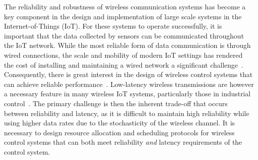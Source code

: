 The reliability and robustness of wireless communication systems has become a key component in the design and implementation of large scale systems in the Internet-of-Things (IoT). For these systems to operate successfully, it is important that the data collected by sensors can be communicated throughout the IoT network. While the most reliable form of data communication is through wired connections, the scale and mobility of modern IoT settings has rendered the cost of installing and maintaining a wired network a significant challenge~\cite{wollschlaeger2017future}. Consequently, there is great interest in the design of wireless control systems that can achieve reliable performance~\cite{varghese2014wireless, li2017review}. Low-latency wireless transmissions are however a necessary feature in many wireless IoT systems, particularly those in industrial control~\cite{varghese2014wireless}.  The primary challenge is then the inherent trade-off that occurs between reliability and latency, as it is difficult to maintain high reliability while using higher data rates due to the stochasticity of the wireless channel. It is necessary to design resource allocation and scheduling protocols for wireless control systems that can both meet reliability \emph{and} latency requirements of the control system.



